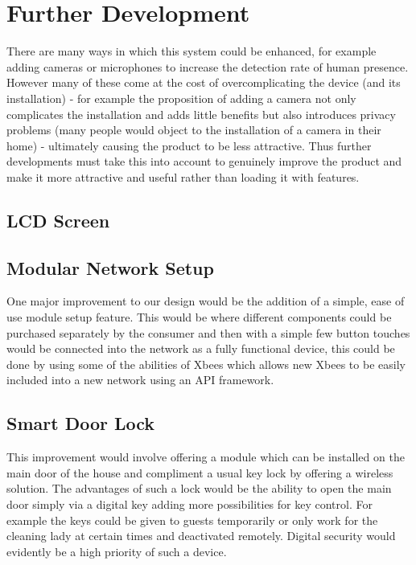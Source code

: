 \documentclass[10.5pt,a4paper,twoside]{report}   %
\begin{document}
\chapter{Further Development}
There are many ways in which this system could be enhanced, for example adding cameras or microphones to increase the detection rate of human presence. However many of these come at the cost of overcomplicating the device (and its installation) - for example the proposition of adding a camera not only complicates the installation and adds little benefits but also introduces privacy problems (many people would object to the installation of a camera in their home) - ultimately causing the product to be less attractive. Thus further developments must take this into account to genuinely improve the product and make it more attractive and useful rather than loading it with features.
\section{LCD Screen}
\section{Modular Network Setup}
One major improvement to our design would be the addition of a simple, ease of use module setup feature. This would be where different components could be purchased separately by the consumer and then with a simple few button touches would be connected into the network as a fully functional device, this could be done by using some of the abilities of Xbees which allows new Xbees to be easily included into a new network using an API framework.
\section{Smart Door Lock} 
This improvement would involve offering a module which can be installed on the main door of the house and compliment a usual key lock by offering a wireless solution. The advantages of such a lock would be the ability to open the main door simply via a digital key adding more possibilities for key control. For example the keys could be given to guests temporarily or only work for the cleaning lady at certain times and deactivated remotely. Digital security would evidently be a high priority of such a device. 
\end{document}
